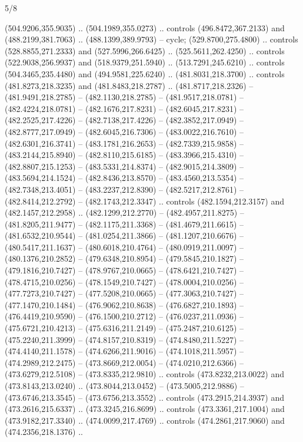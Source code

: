\begin{flagdescription}{5/8}
\begin{scope}[shift={(0.5\flaglength,0.5\flagwidth)},scale=\flagwidth*\stretchfactor/820]
\begin{scope}[scale=1.84,xshift=-135mm,yshift=84mm]
\begin{scope}[y=0.80pt, x=0.80pt, yscale=-1, xscale=1]
\begin{scope}[cm={{1.01416,0.0,0.0,1.033,(-6.79641,-9.89449)}}]
\begin{scope}[draw=c34541f,fill=c448127,line width=0.174\lw]
  (504.9206,355.9035) .. (504.1989,355.0273) .. controls (496.8472,367.2133) and
  (488.2199,381.7063) .. (488.1399,389.9793) -- cycle;
 (529.8700,275.4800) .. controls (528.8855,271.2333) and
  (527.5996,266.6425) .. (525.5611,262.4250) .. controls (522.9038,256.9937) and
  (518.9379,251.5940) .. (513.7291,245.6210) .. controls (504.3465,235.4480) and
  (494.9581,225.6240) .. (481.8031,218.3700) .. controls (481.8273,218.3235) and
  (481.8483,218.2787) .. (481.8717,218.2326) -- (481.9491,218.2785) --
  (482.1130,218.2785) -- (481.9517,218.0781) -- (482.4224,218.0781) --
  (482.1676,217.8231) -- (482.6045,217.8231) -- (482.2525,217.4226) --
  (482.7138,217.4226) -- (482.3852,217.0949) -- (482.8777,217.0949) --
  (482.6045,216.7306) -- (483.0022,216.7610) -- (482.6301,216.3741) --
  (483.1781,216.2653) -- (482.7339,215.9858) -- (483.2144,215.8940) --
  (482.8110,215.6185) -- (483.3966,215.4310) -- (482.8807,215.1253) --
  (483.5331,214.8374) -- (482.9015,214.3809) -- (483.5694,214.1524) --
  (482.8436,213.8570) -- (483.4560,213.5354) -- (482.7348,213.4051) --
  (483.2237,212.8390) -- (482.5217,212.8761) -- (482.8414,212.2792) --
  (482.1743,212.3347) .. controls (482.1594,212.3157) and (482.1457,212.2958) ..
  (482.1299,212.2770) -- (482.4957,211.8275) -- (481.8205,211.9477) --
  (482.1175,211.3368) -- (481.4679,211.6615) -- (481.6532,210.9544) --
  (481.0254,211.3866) -- (481.1207,210.6676) -- (480.5417,211.1637) --
  (480.6018,210.4764) -- (480.0919,211.0097) -- (480.1376,210.2852) --
  (479.6348,210.8954) -- (479.5845,210.1827) -- (479.1816,210.7427) --
  (478.9767,210.0665) -- (478.6421,210.7427) -- (478.4715,210.0256) --
  (478.1549,210.7427) -- (478.0004,210.0256) -- (477.7273,210.7427) --
  (477.5208,210.0665) -- (477.3063,210.7427) -- (477.1470,210.1484) --
  (476.9062,210.8638) -- (476.6827,210.1893) -- (476.4419,210.9590) --
  (476.1500,210.2712) -- (476.0237,211.0936) -- (475.6721,210.4213) --
  (475.6316,211.2149) -- (475.2487,210.6125) -- (475.2240,211.3999) --
  (474.8157,210.8319) -- (474.8480,211.5227) -- (474.4140,211.1578) --
  (474.6266,211.9016) -- (474.1018,211.5957) -- (474.2989,212.2475) --
  (473.8669,212.0054) -- (474.0210,212.6366) -- (473.6279,212.5108) --
  (473.8335,212.9810) .. controls (473.8232,213.0022) and (473.8143,213.0240) ..
  (473.8044,213.0452) -- (473.5005,212.9886) -- (473.6746,213.3545) --
  (473.6756,213.3552) .. controls (473.2915,214.3937) and (473.2616,215.6337) ..
  (473.3245,216.8699) .. controls (473.3361,217.1004) and (473.9182,217.3340) ..
  (474.0099,217.4769) .. controls (474.2861,217.9060) and (474.2356,218.1376) ..

\end{scope}
\end{scope}
\end{scope}
\end{scope}
\end{scope}
\end{flagdescription}

